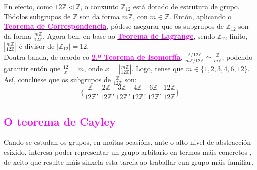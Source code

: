 \documentclass[twoside]{report}
\newcommand{\magbf}[1]{\textcolor{magenta}{\textbf{#1}}} %
\theoremstyle{mystyle}
\begin{document}
\begin{mdframed}[linecolor = magenta]

\noindent En efecto, como $12\mathbb{Z} \triangleleft \mathbb{Z}$, o conxunto $\mathbb{Z}_{12}$ está dotado de estrutura de grupo. \\

\noindent Tódolos subgrupos de $\mathbb{Z}$ son da forma $m\mathbb{Z}$, con $m \in \mathbb{Z}$. Entón, aplicando o \hyperref[th1.8]{\magbf{Teorema de Correspondencia}}, pódese asegurar que os subgrupos de $\mathbb{Z}_{12}$ son da forma $\displaystyle \frac{m\mathbb{Z}}{12\mathbb{Z}}$. Agora ben, en base ao \hyperref[th1.2]{\magbf{Teorema de Lagrange}}, sendo $\mathbb{Z}_{12}$ finito, $|\displaystyle \frac{m\mathbb{Z}}{12\mathbb{Z}}|$ é divisor de $|\mathbb{Z}_{12}| = 12$.\\

\noindent Doutra banda, de acordo co \hyperref[th1.6]{\magbf{2.º Teorema de Isomorfía}}, $\displaystyle \frac{\mathbb{Z}/12\mathbb{Z}}{m\mathbb{Z}/12\mathbb{Z}} \simeq \displaystyle \frac{\mathbb{Z}}{m\mathbb{Z}}$, podendo garantir entón que $\displaystyle \frac{12}{x} = m$, onde $x = |\displaystyle \frac{m\mathbb{Z}}{12\mathbb{Z}}|$. Logo, tense que $m \in \{1,2,3,4,6,12\}$.\\

\noindent Así, conclúese que os subgrupos de $\displaystyle \frac{\mathbb{Z}}{12\mathbb{Z}}$ son: \\

$$\{\displaystyle \frac{\mathbb{Z}}{12\mathbb{Z}}, \displaystyle \frac{2\mathbb{Z}}{12\mathbb{Z}}, \displaystyle \frac{3\mathbb{Z}}{12\mathbb{Z}}, \displaystyle \frac{4\mathbb{Z}}{12\mathbb{Z}}, \displaystyle \frac{6\mathbb{Z}}{12\mathbb{Z}}, \displaystyle \frac{12\mathbb{Z}}{12\mathbb{Z}}\}$$

\end{mdframed}

\textcolor{magenta}{\subsection{O teorema de Cayley}}

\vspace{5mm}

\noindent Cando se estudan os grupos, en moitas ocasións, ante o alto nivel de abstracción esixido, interesa poder representar un grupo arbitario en termos máis concretos , de xeito que resulte máis sinxela esta tarefa ao traballar cun grupo máis familiar. \\
\end{document}
